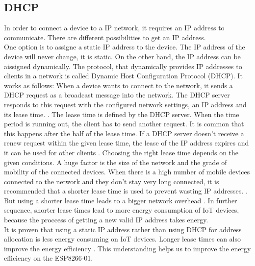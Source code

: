 \subsection{DHCP}
In order to connect a device to a IP network, it requires an IP address to communicate.
There are different possibilities to get an IP address.\\ 
One option is to assigne a static IP address to the device. The IP address of the device will never change, it is static. 
On the other hand, the IP address can be aissigned dynamically.
The protocol, that dynamically provides IP addresses to clients in a network is called Dynamic Host Configuration Protocol (DHCP).
It works as follows: When a device wants to connect to the network, it sends a DHCP request as a broadcast message into the network. 
The DHCP server responds to this request with the configured network settings, an IP address and its lease time. \cite{droms1997rfc2131}.
The lease time is defined by the DHCP server. When the time period is running out, the client has to send another request. 
It is common that this happens after the half of the lease time.
If a DHCP server doesn't receive a renew request within the given lease time, the lease of the IP address expires and it can be used for other clients \cite{10.1145/1298306.1298315}.
Choosing the right lease time depends on the given conditions. A huge factor is the size of the network and the grade of mobility of the connected devices. 
When there is a high number of mobile devices connected to the network and they don't stay very long connected, it is recommended that a shorter lease time is used to prevent wasting IP addresses. \cite{khadilkar2007usage}.
But using a shorter lease time leads to a bigger network overhead \cite{li_how_2018}. 
In further sequence, shorter lease times lead to more energy consumption of IoT devices, because the proccess of getting a new valid IP address takes energy.\\
It is proven that using a static IP address rather than using DHCP for address allocation is less energy consuming on IoT devices. 
Longer lease times can also improve the energy efficiency \cite{department_of_computer_engineering_mehmet_akif_ersoy_university_faculty_of_engineering_and_architecture_burdur_turkey_power_2020}. 
This understanding helps us to improve the energy efficiency on the ESP8266-01.



